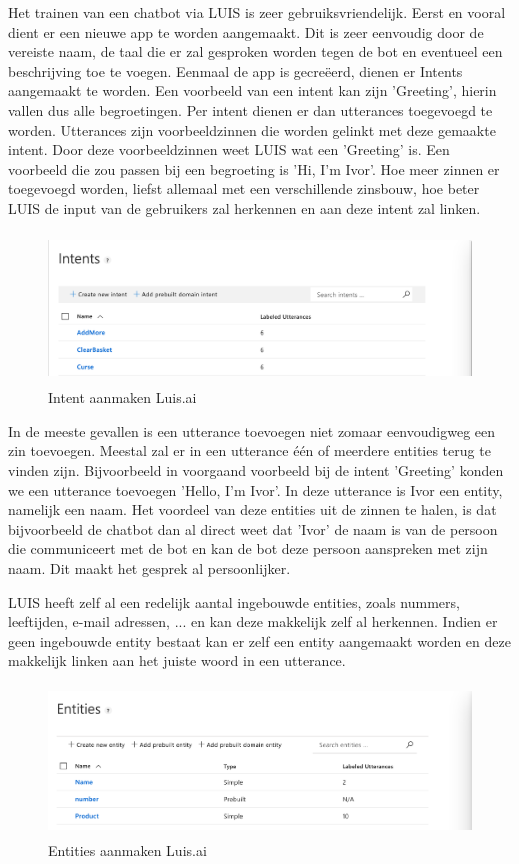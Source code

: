 Het trainen van een chatbot via LUIS is zeer gebruiksvriendelijk. Eerst en vooral dient er een nieuwe app te worden aangemaakt. Dit is zeer eenvoudig door de vereiste naam, de taal die er zal gesproken worden tegen de bot en eventueel een beschrijving toe te voegen. Eenmaal de app is gecreëerd, dienen er Intents aangemaakt te worden. Een voorbeeld van een intent kan zijn 'Greeting', hierin vallen dus alle begroetingen. Per intent dienen er dan utterances toegevoegd te worden. Utterances zijn voorbeeldzinnen die worden gelinkt met deze gemaakte intent. Door deze voorbeeldzinnen weet LUIS wat een 'Greeting' is. Een voorbeeld die zou passen bij een begroeting is 'Hi, I'm Ivor'. Hoe meer zinnen er toegevoegd worden, liefst allemaal met een verschillende zinsbouw, hoe beter LUIS de input van de gebruikers zal herkennen en aan deze intent zal linken.

\begin{figure}[h!]
	\centering
	\includegraphics[height=4cm]{img/intents.png}
	\caption{Intent aanmaken Luis.ai}
	\label{fig:intents}
\end{figure}

In de meeste gevallen is een utterance toevoegen niet zomaar eenvoudigweg een zin toevoegen. Meestal zal er in een utterance één of meerdere entities terug te vinden zijn. Bijvoorbeeld in voorgaand voorbeeld bij de intent 'Greeting' konden we een utterance toevoegen 'Hello, I'm Ivor'. In deze utterance is Ivor een entity, namelijk een naam. Het voordeel van deze entities uit de zinnen te halen, is dat bijvoorbeeld de chatbot dan al direct weet dat 'Ivor' de naam is van de persoon die communiceert met de bot en kan de bot deze persoon aanspreken met zijn naam. Dit maakt het gesprek al persoonlijker.

LUIS heeft zelf al een redelijk aantal ingebouwde entities, zoals nummers, leeftijden, e-mail adressen, ... en kan deze makkelijk zelf al herkennen. Indien er geen ingebouwde entity bestaat kan er zelf een entity aangemaakt worden en deze makkelijk linken aan het juiste woord in een utterance.

\begin{figure}[h!]
	\centering
	\includegraphics[height=4cm]{img/entity.png}
	\caption{Entities aanmaken Luis.ai}
	\label{fig:entity}
\end{figure}

